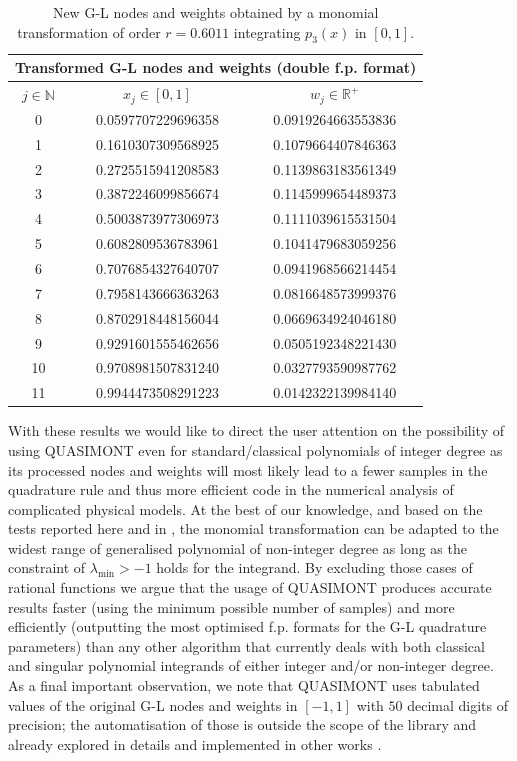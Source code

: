 \documentclass[a4paper, twosided]{book}
\begin{document}
\begin{table}[H]
\centering
\begin{tabular}{|c||c|c|}
\hline
\multicolumn{3}{|c|}{\textbf{Transformed G-L nodes and weights (double f.p. format)}} \\
\hline
$j\in\mathbb{N}$ & $x_j\in[0,1]$ & $w_j\in\mathbb{R}^+$ \\
\hline
0   &  0.0597707229696358   &  0.0919264663553836  \\
1   &  0.1610307309568925   &  0.1079664407846363  \\
2   &  0.2725515941208583   &  0.1139863183561349  \\
3   &  0.3872246099856674   &  0.1145999654489373  \\
4   &  0.5003873977306973   &  0.1111039615531504  \\
5   &  0.6082809536783961   &  0.1041479683059256  \\
6   &  0.7076854327640707   &  0.0941968566214454  \\
7   &  0.7958143666363263   &  0.0816648573999376  \\
8   &  0.8702918448156044   &  0.0669634924046180  \\
9   &  0.9291601555462656   &  0.0505192348221430  \\
10  &  0.9708981507831240   &  0.0327793590987762  \\
11  &  0.9944473508291223   &  0.0142322139984140  \\
\hline
\end{tabular}
  \caption{New G-L nodes and weights obtained by a monomial transformation of order $r=0.6011$ integrating $p_3(x)$ in $[0,1]$.}
  \label{table2.3}
\end{table}

\noindent
With these results we would like to direct the user attention on the possibility of using QUASIMONT even for standard/classical polynomials of integer degree as its processed nodes and weights will most likely lead to a fewer samples in the quadrature rule and thus more efficient code in the numerical analysis of complicated physical models. At the best of our knowledge, and based on the tests reported here and in \cite{Lombardi09, Lombardi21}, the monomial transformation can be adapted to the widest range of generalised polynomial of non-integer degree as long as the constraint of $\lambda_{\text{min}}>-1$ holds for the integrand. By excluding those cases of rational functions we argue that the usage of QUASIMONT produces accurate results faster (using the minimum possible number of samples) and more efficiently (outputting the most optimised f.p. formats for the G-L quadrature parameters) than any other algorithm that currently deals with both classical and singular polynomial integrands of either integer and/or non-integer degree. As a final important observation, we note that QUASIMONT uses tabulated values of the original G-L nodes and weights in $[-1,1]$ with $50$ decimal digits of precision; the automatisation of those is outside the scope of the library and already explored in details and implemented in other works \cite{Gautschi94,Hale13}.
\end{document}
